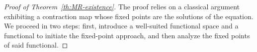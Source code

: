 \documentclass[onefignum,onetabnum]{siamart190516}
\newcommand{\1}{\mathbbm{1}}
\begin{document}
\begin{proof}[Proof of Theorem~\ref{th:MR-existence}]
The proof relies on a classical argument exhibiting a contraction map whose fixed points are the solutions of the equation. We proceed in two steps: first, introduce a well-suited functional space and a functional to initiate the fixed-point approach, and then analyze the fixed points of said functional. 
\smallskip


\end{proof}
\end{document}
